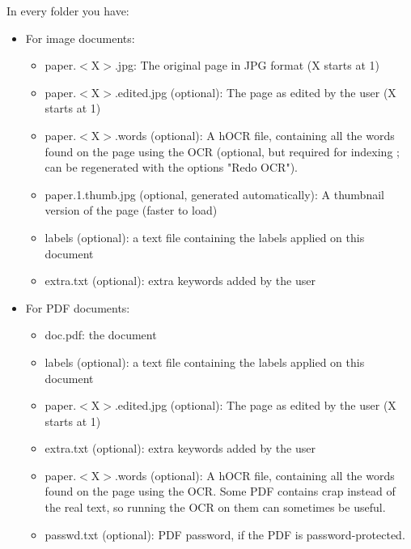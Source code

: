 \documentclass[10pt,a4paper]{article}
\begin{document}
In every folder you have:
\begin{itemize}
	\item For image documents:
	\begin{itemize}
		\item paper.$<$X$>$.jpg: The original page in JPG format (X starts at 1)
		\item paper.$<$X$>$.edited.jpg (optional): The page as edited by the user (X starts at 1)
		\item paper.$<$X$>$.words (optional): A hOCR file, containing all the words
		found on the page using the OCR (optional, but required for indexing
		; can be regenerated with the options "Redo OCR").
		\item paper.1.thumb.jpg (optional, generated automatically): A thumbnail
		version of the page (faster to load)
		\item labels (optional): a text file containing the labels applied on this document
		\item extra.txt (optional): extra keywords added by the user
	\end{itemize}

	\item For PDF documents:
	\begin{itemize}
		\item doc.pdf: the document
		\item labels (optional): a text file containing the labels applied on this document
		\item paper.$<$X$>$.edited.jpg (optional): The page as edited by the user (X starts at 1)
		\item extra.txt (optional): extra keywords added by the user
		\item paper.$<$X$>$.words (optional): A hOCR file, containing all the words
		found on the page using the OCR. Some PDF contains crap instead of
			the real text, so running the OCR on them can sometimes be useful.
		\item passwd.txt (optional): PDF password, if the PDF is
			password-protected.
	\end{itemize}
\end{itemize}
\end{document}
